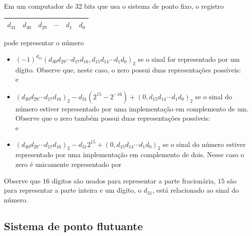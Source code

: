 \begin{ex}
Em um computador de 32 bits que usa o sistema de ponto fixo, o registro
\begin{center}
  \begin{tabular}{|c|c|c|c|c|c|} \hline
    $d_{31}$ & $d_{30}$ & $d_{29}$ & $\cdots$ & $d_1$ & $d_0$\\\hline
  \end{tabular}
\end{center}
pode representar o número
\begin{itemize}
\item $(-1)^{d_{31}}(d_{30}d_{29}\cdots d_{17}d_{16}, d_{15}d_{14}\cdots d_1d_0)_2$
se o sinal for representado por um dígito. Observe que, neste caso, o zero possui duas representações possíveis:
\begin{equation*}
  [10000000000000000000000000000000]
\end{equation*}
e
\begin{equation*}
  [00000000000000000000000000000000]
\end{equation*}
\item $(d_{30}d_{29}\cdots d_{17}d_{16})_2-d_{31}(2^{15}-2^{-16})+(0,d_{15}d_{14}\cdots d_1d_0)_2$
se o sinal do número estiver representado por uma implementação em complemento de um. Observe que o zero também possui duas representações possíveis:
\begin{equation*}
  [11111111111111111111111111111111]
\end{equation*}
e
\begin{equation*}
  [00000000000000000000000000000000]
\end{equation*}
\item $(d_{30}d_{29}\cdots d_{17}d_{16})_2-d_{31}2^{15}+(0,d_{15}d_{14}\cdots d_1d_0)_2$
se o sinal do número estiver representado por uma implementação em complemento de dois. Nesse caso o zero é unicamente representado por
\begin{equation*}
  [00000000000000000000000000000000]
\end{equation*}
\end{itemize}
Observe que $16$ dígitos são usados para representar a parte fracionária, $15$ são para representar a parte inteira e um dígito, o $d_{31}$, está relacionado ao sinal do número.
\end{ex}

\subsection{Sistema de ponto flutuante}

